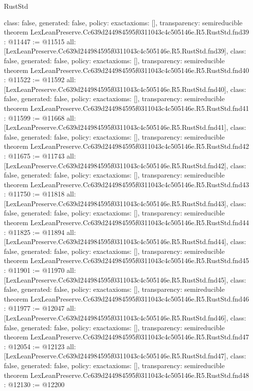 \begin{lexlean}{RustStd}
\begin{coremodule}
{  class: false,
  generated: false,
  policy: exact{axioms: []},
  transparency: semireducible
}
theorem LexLeanPreserve.Cc639d244984595f0311043c4c505146e.R5.RustStd.fnd39 : @11447 := @11515 {
  all: [LexLeanPreserve.Cc639d244984595f0311043c4c505146e.R5.RustStd.fnd39],
  class: false,
  generated: false,
  policy: exact{axioms: []},
  transparency: semireducible
}
theorem LexLeanPreserve.Cc639d244984595f0311043c4c505146e.R5.RustStd.fnd40 : @11522 := @11592 {
  all: [LexLeanPreserve.Cc639d244984595f0311043c4c505146e.R5.RustStd.fnd40],
  class: false,
  generated: false,
  policy: exact{axioms: []},
  transparency: semireducible
}
theorem LexLeanPreserve.Cc639d244984595f0311043c4c505146e.R5.RustStd.fnd41 : @11599 := @11668 {
  all: [LexLeanPreserve.Cc639d244984595f0311043c4c505146e.R5.RustStd.fnd41],
  class: false,
  generated: false,
  policy: exact{axioms: []},
  transparency: semireducible
}
theorem LexLeanPreserve.Cc639d244984595f0311043c4c505146e.R5.RustStd.fnd42 : @11675 := @11743 {
  all: [LexLeanPreserve.Cc639d244984595f0311043c4c505146e.R5.RustStd.fnd42],
  class: false,
  generated: false,
  policy: exact{axioms: []},
  transparency: semireducible
}
theorem LexLeanPreserve.Cc639d244984595f0311043c4c505146e.R5.RustStd.fnd43 : @11750 := @11818 {
  all: [LexLeanPreserve.Cc639d244984595f0311043c4c505146e.R5.RustStd.fnd43],
  class: false,
  generated: false,
  policy: exact{axioms: []},
  transparency: semireducible
}
theorem LexLeanPreserve.Cc639d244984595f0311043c4c505146e.R5.RustStd.fnd44 : @11825 := @11894 {
  all: [LexLeanPreserve.Cc639d244984595f0311043c4c505146e.R5.RustStd.fnd44],
  class: false,
  generated: false,
  policy: exact{axioms: []},
  transparency: semireducible
}
theorem LexLeanPreserve.Cc639d244984595f0311043c4c505146e.R5.RustStd.fnd45 : @11901 := @11970 {
  all: [LexLeanPreserve.Cc639d244984595f0311043c4c505146e.R5.RustStd.fnd45],
  class: false,
  generated: false,
  policy: exact{axioms: []},
  transparency: semireducible
}
theorem LexLeanPreserve.Cc639d244984595f0311043c4c505146e.R5.RustStd.fnd46 : @11977 := @12047 {
  all: [LexLeanPreserve.Cc639d244984595f0311043c4c505146e.R5.RustStd.fnd46],
  class: false,
  generated: false,
  policy: exact{axioms: []},
  transparency: semireducible
}
theorem LexLeanPreserve.Cc639d244984595f0311043c4c505146e.R5.RustStd.fnd47 : @12054 := @12123 {
  all: [LexLeanPreserve.Cc639d244984595f0311043c4c505146e.R5.RustStd.fnd47],
  class: false,
  generated: false,
  policy: exact{axioms: []},
  transparency: semireducible
}
theorem LexLeanPreserve.Cc639d244984595f0311043c4c505146e.R5.RustStd.fnd48 : @12130 := @12200 {
}
\end{coremodule}
\end{lexlean}
